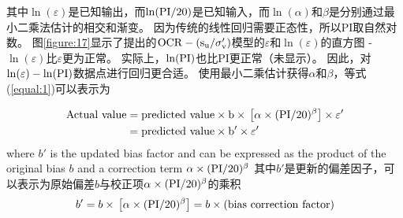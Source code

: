 \begin{Parallel}{0.60\textwidth}{}
{    }
    \ParallelRText
    {
        其中$\ln(\varepsilon)$是已知输出，而$\ln(\rm{PI}/20)$是已知输入，而$\ln(\alpha)$和$\beta$是分别通过最小二乘法估计的相交和渐变。 因为传统的线性回归需要正态性，所以PI取自然对数。 图\ref{figure:17}显示了\citet{Jamiolkowski198557}提出的$\rm{OCR}-(s_u/\sigma_v')$模型的$\varepsilon$和$\ln(\varepsilon)$的直方图 - $\ln(\varepsilon)$比$\varepsilon$更为正常。 实际上，$\ln(\rm{PI})$也比PI更正常（未显示）。 因此，对$\ln(\varepsilon)-\ln(\rm{PI})$数据点进行回归更合适。 使用最小二乘估计获得$\alpha$和$\beta$，等式(\ref{equal:1})可以表示为
    }
    \ParallelPar
    
    \begin{align}
        \rm{Actual~value}&=\rm{predicted~value}\times{}b\times{}\left[\alpha\times{}(\rm{PI}/20)^\beta\right]\times{}\varepsilon'\nonumber\\
        &=\rm{predicted~value}\times{}b'\times{}\varepsilon'
        \label{equal:6}
    \end{align}
    \ParallelLText
    {
        where $b'$ is the updated bias factor and can be expressed as the product of the original bias $b$ and a correction term $\alpha\times{}(\rm{PI}/20)^\beta$
    }
    \ParallelRText
    {
        其中$b'$是更新的偏差因子，可以表示为原始偏差$b$与校正项$\alpha\times{}(\rm{PI}/20)^\beta$的乘积
    }
    \ParallelPar
    \begin{align}
        b'=b\times{}\left[\alpha\times{}(\rm{PI}/20)^\beta\right]=b\times{}(\rm{bias~correction~factor})
        \label{equal:7}
    \end{align}
    \ParallelLText
    {

    }
    \ParallelRText
    {

    }
\end{Parallel}